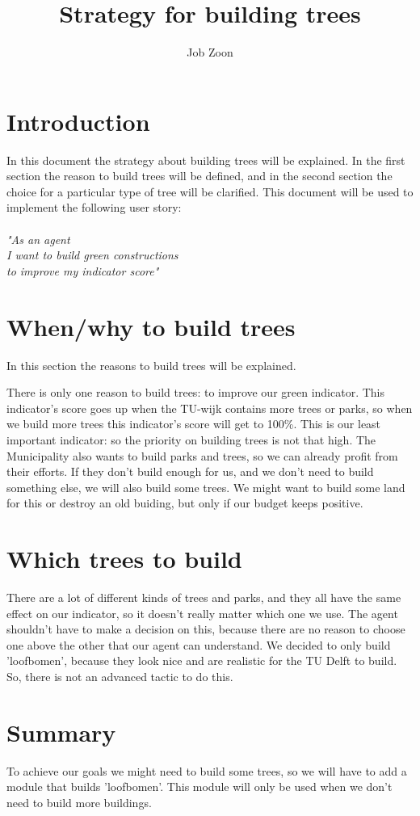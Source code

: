 \documentclass{article}
\author{Job Zoon}
\title{Strategy for building trees}
\begin{document}

\maketitle{}
\newpage{}

\section{Introduction}
In this document the strategy about building trees will be explained. In the first section the reason to build trees will be defined, and in the second section the choice for a particular type of tree will be clarified. This document will be used to implement the following user story:\\
\\
\textit{"As an agent\\
I want to build green constructions\\
to improve my indicator score"}

\section{When/why to build trees}
In this section the reasons to build trees will be explained. 

There is only one reason to build trees: to improve our green indicator. This indicator's score goes up when the TU-wijk contains more trees or parks, so when we build more trees this indicator's score will get to 100\%. This is our least important indicator: so the priority on building trees is not that high. The Municipality also wants to build parks and trees, so we can already profit from their efforts. If they don't build enough for us, and we don't need to build something else, we will also build some trees. We might want to build some land for this or destroy an old buiding, but only if our budget keeps positive.

\section{Which trees to build}
There are a lot of different kinds of trees and parks, and they all have the same effect on our indicator, so it doesn't really matter which one we use. The agent shouldn't have to make a decision on this, because there are no reason to choose one above the other that our agent can understand. We decided to only build 'loofbomen', because they look nice and are realistic for the TU Delft to build. So, there is not an advanced tactic to do this.

\section{Summary}
To achieve our goals we might need to build some trees, so we will have to add a module that builds 'loofbomen'. This module will only be used when we don't need to build more buildings.
\end{document}
